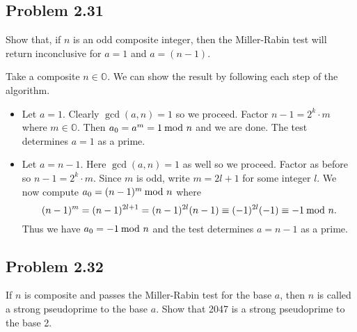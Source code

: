 \documentclass[../hw_sols.tex]{subfiles}
\begin{document}

\subsection*{Problem 2.31}

Show that, if $n$ is an odd composite integer, then the Miller-Rabin test will 
return inconclusive for $a = 1$ and $a = (n - 1)$.

\begin{solution}

Take a composite $n \in \mathbb{O}$. We can show the result by following each 
step of the algorithm.

\begin{itemize}

\item Let $a = 1$. Clearly $\gcd(a,n) = 1$ so we proceed. Factor 
$n-1 = 2^k \cdot m$ where $m \in \mathbb{O}$. Then $a_0 = a^m = 1 \tmod{n}$ 
and we are done. The test determines $a = 1$ as a prime.
	
\item Let $a = n-1$. Here $\gcd(a,n) = 1$ as well so we proceed. Factor as 
before so $n-1=2^k\cdot m$. Since $m$ is odd, write $m = 2l + 1$ for some 
integer $l$. We now compute $a_0 = (n-1)^m \tmod{n}$ where
	$$(n-1)^m = (n-1)^{2l+1} = (n-1)^{2l}(n-1) 
	\equiv 
	(-1)^{2l}(-1) \equiv -1 \tmod{n}.$$
Thus we have $a_0 = -1 \tmod{n}$ and the test determines $a = n-1$ as a prime.

\end{itemize}

\end{solution}


\newpage



\subsection*{Problem 2.32}

If $n$ is composite and passes the Miller-Rabin test for the base $a$, then 
$n$ is called a strong pseudoprime to the base $a$. Show that 2047 is a strong 
pseudoprime to the base 2.
\end{document}

